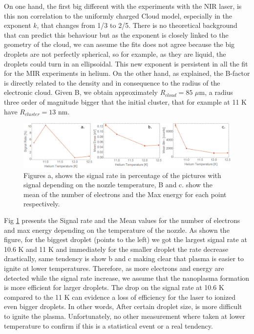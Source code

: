 On one hand, the first big different with the experiments with the NIR laser, is this non correlation to the uniformly charged Cloud model, especially in the exponent $k$, that changes from 1/3 to 2/5. There is no theoretical background that can predict this behaviour but as the exponent is closely linked to the geometry of the cloud, we can assume the fits does not agree because the  big droplets are not perfectly spherical, so for example, as they are liquid, the droplets could turn in an ellipsoidal. This new exponent is persistent in all the fit for the MIR experiments in helium. On the other hand, as explained, the B-factor is directly related to the density and in consequence to the radius of the electronic cloud. Given B, we obtain approximately $R_{cloud}=85$  $\mu$m, a radius three order of magnitude bigger that the initial cluster, that for example at 11 K have $R_{cluster}=13$ nm.

\begin{figure}[h!]
\centering
\includegraphics[width=16 cm]{../Images/results/Mir_He_Dropletsize/signalrates.png} 
\caption[He-Xe, signal rate droplet size]{Figures a, shows the signal rate in percentage of the pictures with signal depending on the nozzle temperature, B and c. show the mean of the number of electrons and the Max energy for each point respectively.}
\label{fig:sigratedropletsize}
\end{figure}

Fig \ref{fig:sigratedropletsize} presents the Signal rate and the Mean values for the number of electrons and max energy depending on the temperature of the nozzle. As shown the figure, for the biggest droplet (points to the left) we got the largest signal rate at 10.6 K and 11 K and immediately for the smaller droplet the rate decrease drastically, same tendency is show b and c making clear that plasma is easier to ignite at lower temperatures. Therefore, as more electrons and energy are detected while the signal rate increase, we assume that the nanoplasma formation is more efficient for larger droplets. The drop on the signal rate at 10.6 K compared to the 11 K can evidence a loss of efficiency for the laser to ionized even bigger droplets. In other words, After certain droplet size, is more difficult to ignite the plasma.  Unfortunately, no other measurement where taken at lower temperature to confirm if this is a statistical event or a real tendency.


